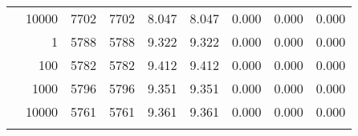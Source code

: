 \begin{table}
\begin{tabular}{rrrrrrrrr}
	            
					 &  
					 
					\multirow{ 1 }{*}{ 10000 } &
					
						
							    
							     7702  & 7702  
	                           & 8.047 & 8.047 & 0.000
	                           & 0.000 & 0.000  \\
	                
	            
	        
				\noalign{\smallskip}\hline
				\multirow{ 4 }{*}{ 500000 } &
				
					
					 
					\multirow{ 1 }{*}{ 1 } &
					
						
							    
							     5788  & 5788  
	                           & 9.322 & 9.322 & 0.000
	                           & 0.000 & 0.000  \\
	                
	            
					 &  
					 
					\multirow{ 1 }{*}{ 100 } &
					
						
							    
							     5782  & 5782  
	                           & 9.412 & 9.412 & 0.000
	                           & 0.000 & 0.000  \\
	                
	            
					 &  
					 
					\multirow{ 1 }{*}{ 1000 } &
					
						
							    
							     5796  & 5796  
	                           & 9.351 & 9.351 & 0.000
	                           & 0.000 & 0.000  \\
	                
	            
					 &  
					 
					\multirow{ 1 }{*}{ 10000 } &
					
						
							    
							     5761  & 5761  
	                           & 9.361 & 9.361 & 0.000
	                           & 0.000 & 0.000  \\
	                
	            
	        
				\noalign{\smallskip}\hline
				\multirow{ 4 }{*}{ 1000000 } &
				
					
					 

\end{tabular}
\end{table}
